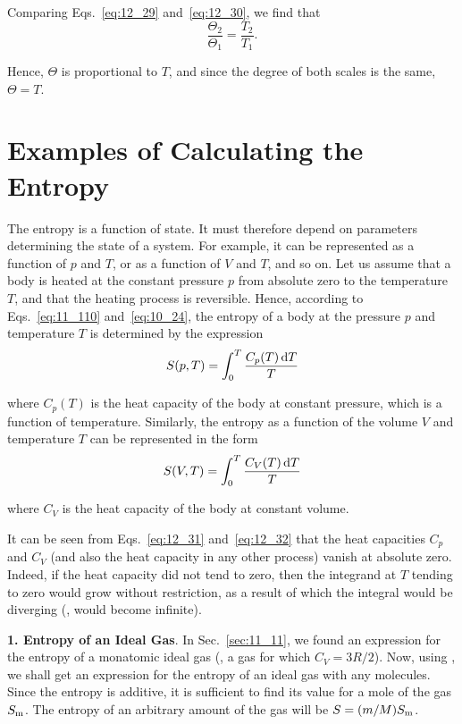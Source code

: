 \noindent
Comparing Eqs.~\eqref{eq:12_29} and~\eqref{eq:12_30}, we find that
\begin{equation*}
	\frac{\Theta_2}{\Theta_1} = \frac{T_2}{T_1}.
\end{equation*}

\noindent
Hence, $\Theta$ is proportional to $T$, and since the degree of both scales is the same, $\Theta=T$.

\section{Examples of Calculating the Entropy}\label{sec:12_4}

The entropy is a function of state. It must therefore depend on parameters determining the state of a system. For example, it can be represented as a function of $p$ and $T$, or as a function of $V$ and $T$, and so on. Let us assume that a body is heated at the constant pressure $p$ from absolute zero to the temperature $T$, and that the heating process is reversible. Hence, according to Eqs.~\eqref{eq:11_110} and~\eqref{eq:10_24}, the entropy of a body at the pressure $p$ and temperature $T$ is determined by the expression
\begin{equation}\label{eq:12_31}
	S(p,T) = \int_{0}^{T} \frac{C_p(T)\,\mathrm{d} T}{T}
\end{equation}

\noindent
where $C_p(T)$ is the heat capacity of the body at constant pressure, which is a function of temperature. Similarly, the entropy as a function of the volume $V$ and temperature $T$ can be represented in the form
\begin{equation}\label{eq:12_32}
	S(V,T) = \int_{0}^{T} \frac{C_V(T)\,\mathrm{d} T}{T}
\end{equation}

\noindent
where $C_V$ is the heat capacity of the body at constant volume.

It can be seen from Eqs.~\eqref{eq:12_31} and~\eqref{eq:12_32} that the heat capacities $C_p$ and $C_V$ (and also the heat capacity in any other process) vanish at absolute zero. Indeed, if the heat capacity did not tend to zero, then the integrand at $T$ tending to zero would grow without restriction, as a result of which the integral would be diverging (\ie, would become infinite).

\textbf{1. Entropy of an Ideal Gas}. In Sec.~\ref{sec:11_11}, we found an expression for the entropy of a monatomic ideal gas (\ie, a gas for which $C_V=3R/2$). Now, using , we shall get an expression for the entropy of an ideal gas with any molecules. Since the entropy is additive, it is sufficient to find its value for a mole of the gas $S_{\text{m}}$. The entropy of an arbitrary amount of the gas will be $S=(m/M)S_{\text{m}}$.


